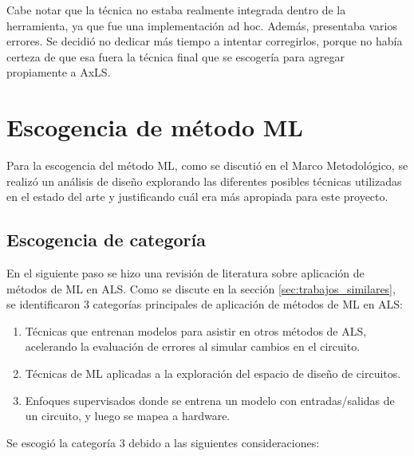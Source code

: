 Cabe notar que la técnica no estaba realmente integrada dentro de la
herramienta, ya que fue una implementación ad hoc. Además, presentaba varios
errores. Se decidió no dedicar más tiempo a intentar corregirlos, porque no
había certeza de que esa fuera la técnica final que se escogería para agregar
propiamente a AxLS.

\section{Escogencia de método ML}

Para la escogencia del método ML, como se discutió en el Marco Metodológico, se
realizó un análisis de diseño explorando las diferentes posibles técnicas
utilizadas en el estado del arte y justificando cuál era más apropiada para
este proyecto.


\subsection{Escogencia de categoría}

En el siguiente paso se hizo una revisión de literatura sobre aplicación de
métodos de ML en ALS.
Como se discute en la sección \ref{sec:trabajos_similares}, se identificaron 3
categorías principales de aplicación de métodos de ML en ALS:

\begin{enumerate}
    \item Técnicas que entrenan modelos para asistir en otros métodos de ALS,
      acelerando la evaluación de errores al simular cambios en el circuito.
    \item Técnicas de ML aplicadas a la exploración del espacio de diseño de
      circuitos.
    \item Enfoques supervisados donde se entrena un modelo con entradas/salidas
      de un circuito, y luego se mapea a hardware.
\end{enumerate}

Se escogió la categoría 3 debido a las siguientes consideraciones:

